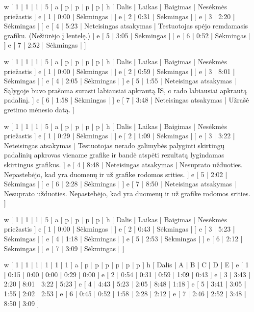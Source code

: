 
\xtable
{
  w [ 1 | 1 | 1 | 5 ]
  a [ p | p | p | p ]
  h [ Dalis | Laikas | Baigimas | Nesėkmės priežastis ]
  e [ 1 | 0:00 | Sėkmingas | ]
  e [ 2 | 0:31 | Sėkmingas | ]
  e [ 3 | 2:20 | Sėkmingas | ]
  e [ 4 | 5:23 | Neteisingas atsakymas |
    Testuotojas spėjo remdamasis grafiku. (Nežiūrėjo į lentelę.)
    ]
  e [ 5 | 3:05 | Sėkmingas | ]
  e [ 6 | 0:52 | Sėkmingas | ]
  e [ 7 | 2:52 | Sėkmingas | ]
}


\xtable
{
  w [ 1 | 1 | 1 | 5 ]
  a [ p | p | p | p ]
  h [ Dalis | Laikas | Baigimas | Nesėkmės priežastis ]
  e [ 1 | 0:00 | Sėkmingas | ]
  e [ 2 | 0:59 | Sėkmingas | ]
  e [ 3 | 8:01 | Sėkmingas | ]
  e [ 4 | 2:05 | Sėkmingas | ]
  e [ 5 | 1:55 | Neteisingas atsakymas |
    Sąlygoje buvo prašoma surasti labiausiai apkrautą IS, o rado
    labiausiai apkrautą padalinį.
    ]
  e [ 6 | 1:58 | Sėkmingas | ]
  e [ 7 | 3:48 | Neteisingas atsakymas |
    Užrašė gretimo mėnesio datą.
    ]
}


\xtable
{
  w [ 1 | 1 | 1 | 5 ]
  a [ p | p | p | p ]
  h [ Dalis | Laikas | Baigimas | Nesėkmės priežastis ]
  e [ 1 | 0:29 | Sėkmingas | ]
  e [ 2 | 1:09 | Sėkmingas | ]
  e [ 3 | 3:22 | Neteisingas atsakymas |
    Testuotojas nerado galimybės palyginti skirtingų padalinių apkrovas
    viename grafike ir bandė atspėti rezultatą lygindamas skirtingus
    grafikus.
    ]
  e [ 4 | 8:48 | Neteisingas atsakymas |
    Nesuprato užduoties. Nepastebėjo, kad yra duomenų ir už grafike
    rodomos srities.
    ]
  e [ 5 | 2:02 | Sėkmingas | ]
  e [ 6 | 2:28 | Sėkmingas | ]
  e [ 7 | 8:50 | Neteisingas atsakymas |
    Nesuprato užduoties. Nepastebėjo, kad yra duomenų ir už grafike
    rodomos srities.
    ]
}


\xtable
{
  w [ 1 | 1 | 1 | 5 ]
  a [ p | p | p | p ]
  h [ Dalis | Laikas | Baigimas | Nesėkmės priežastis ]
  e [ 1 | 0:00 | Sėkmingas | ]
  e [ 2 | 0:43 | Sėkmingas | ]
  e [ 3 | 5:23 | Sėkmingas | ]
  e [ 4 | 1:18 | Sėkmingas | ]
  e [ 5 | 2:53 | Sėkmingas | ]
  e [ 6 | 2:12 | Sėkmingas | ]
  e [ 7 | 3:09 | Sėkmingas | ]
}


\xtable
{
  w [ 1 | 1 | 1 | 1 | 1 | 1 ]
  a [ p | p | p | p | p | p ]
  h [ Dalis | A | B | C | D | E ]
  e [ 1 | 0:15 | 0:00 | 0:00 | 0:29 | 0:00 ]
  e [ 2 | 0:54 | 0:31 | 0:59 | 1:09 | 0:43 ]
  e [ 3 | 3:43 | 2:20 | 8:01 | 3:22 | 5:23 ]
  e [ 4 | 4:43 | 5:23 | 2:05 | 8:48 | 1:18 ]
  e [ 5 | 3:41 | 3:05 | 1:55 | 2:02 | 2:53 ]
  e [ 6 | 0:45 | 0:52 | 1:58 | 2:28 | 2:12 ]
  e [ 7 | 2:46 | 2:52 | 3:48 | 8:50 | 3:09 ]
}
